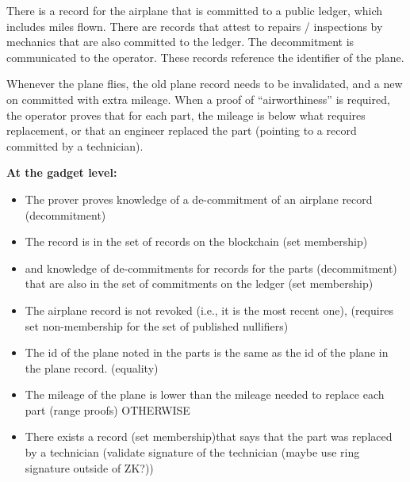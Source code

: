 There is a record for the airplane that is committed to a public ledger, which includes miles flown. \newline
There are records that attest to repairs / inspections by mechanics that are also committed to the ledger. The decommitment is communicated to the operator. These records reference the identifier of the plane.

Whenever the plane flies, the old plane record needs to be invalidated, and a new on committed with extra mileage.  \newline
When a proof of “airworthiness” is required, the operator proves that for each part, the mileage is below what requires replacement, or that an engineer replaced the part (pointing to a record committed by a technician).

\textbf{At the gadget level: }
\begin{itemize}
    \item The prover proves knowledge of a de-commitment of an airplane record (decommitment) 
    \item The record is in the set of records on the blockchain (set membership)
    \item and knowledge of de-commitments for records for the parts (decommitment) that are also in the set of commitments on the ledger (set membership)
    \item The airplane record is not revoked (i.e., it is the most recent one), (requires set non-membership for the set of published nullifiers)
    \item The id of the plane noted in the parts is the same as the id of the plane in the plane record.  (equality) 
    \item The mileage of the plane is lower than the mileage needed to replace each part (range proofs) OTHERWISE 
    \item There exists a record (set membership)that says  that the part was replaced by a technician (validate signature of the technician (maybe use ring signature outside of ZK?))
		\end{itemize}
